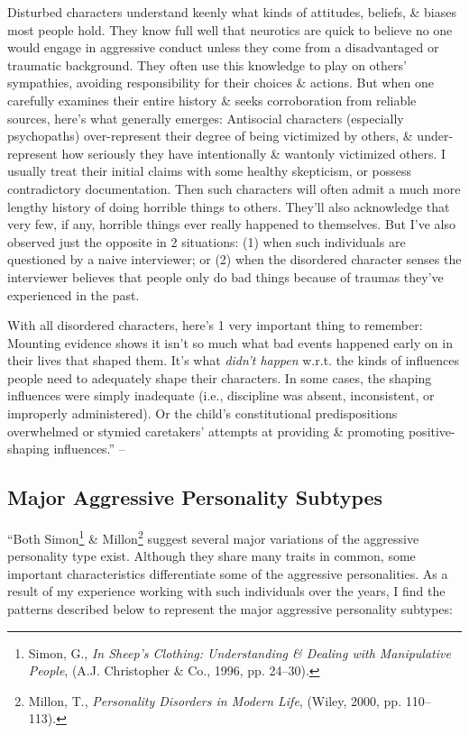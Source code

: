 \documentclass{article}
\numberwithin{equation}{section}
\begin{document}
Disturbed characters understand keenly what kinds of attitudes, beliefs, \& biases most people hold. They know full well that neurotics are quick to believe no one would engage in aggressive conduct unless they come from a disadvantaged or traumatic background. They often use this knowledge to play on others' sympathies, avoiding responsibility for their choices \& actions. But when one carefully examines their entire history \& seeks corroboration from reliable sources, here's what generally emerges: Antisocial characters (especially psychopaths) over-represent their degree of being victimized by others, \& under-represent how seriously they have intentionally \& wantonly victimized others. I usually treat their initial claims with some healthy skepticism, or possess contradictory documentation. Then such characters will often admit a much more lengthy history of doing horrible things to others. They'll also acknowledge that very few, if any, horrible things ever really happened to themselves. But I've also observed just the opposite in 2 situations: (1) when such individuals are questioned by a naive interviewer; or (2) when the disordered character senses the interviewer believes that people only do bad things because of traumas they've experienced in the past.

With all disordered characters, here's 1 very important thing to remember: Mounting evidence shows it isn't so much what bad events happened early on in their lives that shaped them. It's what \textit{didn't happen} w.r.t. the kinds of influences people need to adequately shape their characters. In some cases, the shaping influences were simply inadequate (i.e., discipline was absent, inconsistent, or improperly administered). Or the child's constitutional predispositions overwhelmed or stymied caretakers' attempts at providing \& promoting positive-shaping influences.'' -- \cite[pp. 100--104]{Simon2011}

\subsection{Major Aggressive Personality Subtypes}
``Both Simon\footnote{Simon, G., \textit{In Sheep's Clothing: Understanding \& Dealing with Manipulative People}, (A.J. Christopher \& Co., 1996, pp. 24--30).} \& Millon\footnote{Millon, T., \textit{Personality Disorders in Modern Life}, (Wiley, 2000, pp. 110--113).} suggest several major variations of the aggressive personality type exist. Although they share many traits in common, some important characteristics differentiate some of the aggressive personalities. As a result of my experience working with such individuals over the years, I find the patterns described below to represent the major aggressive personality subtypes:
\end{document}
